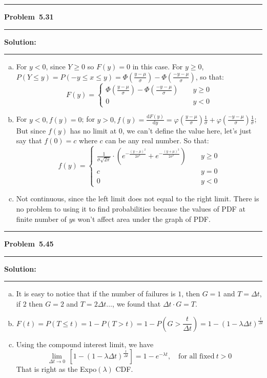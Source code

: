 \documentclass[10.5pt]{article}
\newcommand\question[1]{\vspace{.2in}\hrule\vspace{0.04in}\textbf{Problem\ #1}\vspace{.4em}\hrule\vspace{.10in}}
\newcommand\Solution{\vspace{.3in}\textbf{Solution:}\vspace{.5em}\hrule\vspace{.08in}\par}
\begin{document}
\question{5.31}
	\Solution{}
\begin{enumerate}[(a)]
	\item For $y<0$, since $Y\geqslant0$ so $F(y) = 0$ in this case.
	For $y\geqslant0$, $P(Y\leqslant y) = P(-y\leqslant x \leqslant y) = \Phi(\frac{y - \mu}{\sigma}) - \Phi(\frac{-y - \mu}{\sigma})$, so that:
	\begin{equation*}
		F(y) = 
		\begin{cases}
			\Phi(\frac{y - \mu}{\sigma}) - \Phi(\frac{-y - \mu}{\sigma})&\quad\ y\geqslant0\\[6pt]
			0&\quad\ y<0
		\end{cases}
	\end{equation*}\vspace{1cm}
	\item For $y<0, f(y)=0$; 
	for $y>0, f(y) = \frac{\mathrm{d} F(y)}{\mathrm{d} y}=\varphi(\frac{y - \mu}{\sigma})\frac{1}{\sigma}+\varphi(\frac{-y - \mu}{\sigma})\frac{1}{\sigma}$; 
	But since $f(y)$ has no limit at 0, we can't define the value here, let's just say that $f(0) = c$ where $c$ can be any real number. So that:
	\begin{equation*}
		f(y) = 
		\begin{cases}
			\frac{1}{\sigma\sqrt{2\pi}}\cdot(e^{-\frac{(y-\mu)^2}{2\sigma^2}}+e^{-\frac{(y+\mu)^2}{2\sigma^2}})&\quad\ y\geqslant0\\[6pt]
			c&\quad\ y=0\\[6pt]
			0&\quad\ y<0
		\end{cases}
	\end{equation*}\vspace{1cm}
	\item Not continuous, since the left limit does not equal to the right limit. There is no problem to using it to find probabilities because the values of PDF at finite number of $y$s won't affect area under the graph of PDF.
\end{enumerate}
	
\vspace{0.2cm}


\question{5.45}
\Solution{}
\begin{enumerate}[(a)]
	\item It is easy to notice that if the number of failures is $1$, then $G = 1$ and $T = \Delta t$, if $2$ then $G = 2$ and $T = 2\Delta t\dots$, we found that $\Delta t\cdot G = T$.\vspace{0.2cm}
	\item $$F(t) = P(T \leqslant t) = 1-P(T>t) = 1 - P(G > \frac{t}{\Delta t}) = 1 - (1-\lambda\Delta t)^{\frac{t}{\Delta t}}$$\vspace{0.2cm}
	\item Using the compound interest limit, we have $$\lim_{\Delta t \to 0}\,\left[1 - (1-\lambda\Delta t)^{\frac{t}{\Delta t}}\right] = 1 - e^{-\lambda t},\quad \text{for all fixed}\ t>0$$
	That is right as the Expo$(\lambda)$ CDF.
\end{enumerate}
\end{document}
